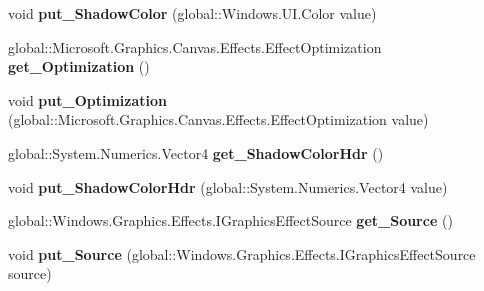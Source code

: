 \begin{DoxyCompactItemize}
void {\bfseries put\+\_\+\+Shadow\+Color} (global\+::\+Windows.\+U\+I.\+Color value)
\item 
\mbox{\label{interface_microsoft_1_1_graphics_1_1_canvas_1_1_effects_1_1_i_shadow_effect_a3d8042cc4e97fb3285cfbbb0f3c8a52f}} 
global\+::\+Microsoft.\+Graphics.\+Canvas.\+Effects.\+Effect\+Optimization {\bfseries get\+\_\+\+Optimization} ()
\item 
\mbox{\label{interface_microsoft_1_1_graphics_1_1_canvas_1_1_effects_1_1_i_shadow_effect_a47609594c0d8db1c5d91cfbd3413feba}} 
void {\bfseries put\+\_\+\+Optimization} (global\+::\+Microsoft.\+Graphics.\+Canvas.\+Effects.\+Effect\+Optimization value)
\item 
\mbox{\label{interface_microsoft_1_1_graphics_1_1_canvas_1_1_effects_1_1_i_shadow_effect_aac90c7161656038d0dfc1177b36c6c66}} 
global\+::\+System.\+Numerics.\+Vector4 {\bfseries get\+\_\+\+Shadow\+Color\+Hdr} ()
\item 
\mbox{\label{interface_microsoft_1_1_graphics_1_1_canvas_1_1_effects_1_1_i_shadow_effect_ae97d7959236ba2f08e531718a11a4983}} 
void {\bfseries put\+\_\+\+Shadow\+Color\+Hdr} (global\+::\+System.\+Numerics.\+Vector4 value)
\item 
\mbox{\label{interface_microsoft_1_1_graphics_1_1_canvas_1_1_effects_1_1_i_shadow_effect_a344919ac690c7502e2a1c28ee4f5966f}} 
global\+::\+Windows.\+Graphics.\+Effects.\+I\+Graphics\+Effect\+Source {\bfseries get\+\_\+\+Source} ()
\item 
\mbox{\label{interface_microsoft_1_1_graphics_1_1_canvas_1_1_effects_1_1_i_shadow_effect_acea577b60a4e50cef4fea7cdea1764f9}} 
void {\bfseries put\+\_\+\+Source} (global\+::\+Windows.\+Graphics.\+Effects.\+I\+Graphics\+Effect\+Source source)
\item 
\mbox{\label{interface_microsoft_1_1_graphics_1_1_canvas_1_1_effects_1_1_i_shadow_effect_a49b43e4fdcdcf0af12d8a5e4005a11e8}} 

\end{DoxyCompactItemize}
